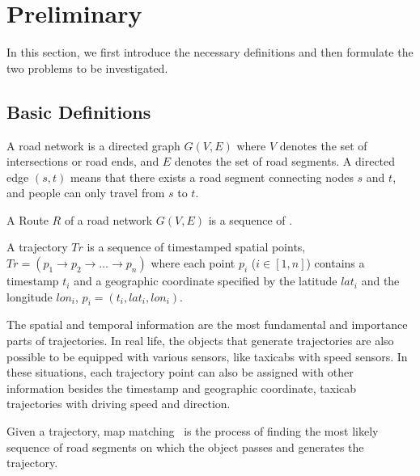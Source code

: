 \section{Preliminary}
\label{sec-preliminary}

In this section, we first introduce the necessary definitions %
and then formulate the two problems to be investigated.

\subsection{Basic Definitions}
\label{subsec-definition}

\begin{definition}A road network is a directed graph $G(V, E)$ where $V$ denotes the set of intersections or road ends, and $E$ denotes the set of road segments. A directed edge $(s, t)$ means that there exists a road segment connecting nodes $s$ and $t$, and people can only travel from $s$ to $t$.
\end{definition}


\begin{definition}[Route]A Route $R$ of a road network $G(V, E)$ is a sequence of .
\end{definition}


\begin{definition}[Trajectory]A trajectory $Tr$ is a sequence of timestamped spatial points, $Tr = (p_1 \rightarrow p_2 \rightarrow \dots \rightarrow p_n)$ where each point $p_i$ ($i\in[1,n]$) contains a timestamp $t_i$ and a geographic coordinate specified by the latitude $lat_i$ and the longitude $lon_i$, \ie $p_i=(t_i,lat_i,lon_i)$.
\end{definition}

The spatial and temporal information are the most fundamental and importance parts of trajectories. In real life, the objects that generate trajectories are also possible to be equipped with various sensors, like taxicabs with speed sensors. In these situations, each trajectory point can also be assigned with other information besides the timestamp and geographic coordinate, \eg taxicab trajectories with driving speed and direction.


\begin{definition}Given a trajectory, map matching~\cite{Newson2009MM,WuMSZZCWKDD16} is the process of finding the most likely sequence of road segments on which the object passes and generates the trajectory.
\end{definition}

